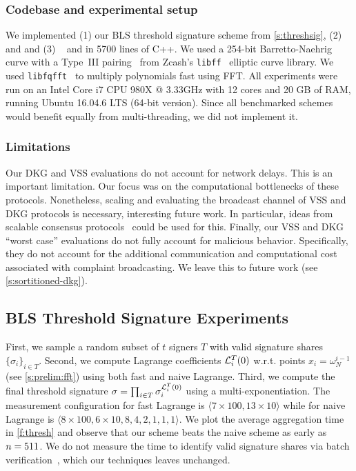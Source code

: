 \subsubsection{Codebase and experimental setup}
We implemented (1) our BLS threshold signature scheme from \cref{s:threshsig}, (2) \ejfdkg~\cite{Kate2010Distributed} and \ourdkg and (3) \evss~\cite{polycommit} and \ourvss in 5700 lines of C++.
We used a 254-bit Barretto-Naehrig curve with a Type~III pairing~\cite{bn-curve} from Zcash's \texttt{libff}~\cite{libff} elliptic curve library.
We used \texttt{libfqfft}~\cite{libfqfft} to multiply polynomials fast using FFT.
All experiments were run on an Intel Core i7 CPU 980X @ 3.33GHz with 12 cores and 20 GB of RAM, running Ubuntu 16.04.6 LTS (64-bit version).
Since all benchmarked schemes would benefit equally from multi-threading, we did not implement it.

\subsubsection{Limitations}
\label{s:eval:limitations}
Our DKG and VSS evaluations do not account for network delays.
This is an important limitation.
Our focus was on the computational bottlenecks of these protocols.
Nonetheless, scaling and evaluating the broadcast channel of VSS and DKG protocols is necessary, interesting future work.
In particular, ideas from scalable consensus protocols~\cite{algorand} could be used for this.
Finally, our VSS and DKG ``worst case'' evaluations do not fully account for malicious behavior.
Specifically, they do not account for the additional communication and computational cost associated with complaint broadcasting.
We leave this to future work (see \cref{s:sortitioned-dkg}).

\subsection{BLS Threshold Signature Experiments}
\label{s:eval:threshsig}
First, we sample a random subset of $t$ signers $T$ with valid signature shares $\{\sigma_i\}_{i\in T}$.
Second, we compute Lagrange coefficients $\mathcal{L}_i^T(0)$ w.r.t. points $x_i = \omega_N^{i-1}$ (see \cref{s:prelim:fft}) using both fast and naive Lagrange.
Third, we compute the final threshold signature $\sigma = \prod_{i\in T} \sigma_i^{\mathcal{L}_i^T(0)}$ using a multi-exponentiation.
The measurement configuration for fast Lagrange is $\langle 7 \times 100, 13 \times 10 \rangle$ while for naive Lagrange is $\langle 8\times 100, 6 \times 10, 8, 4, 2, 1,1,1\rangle$.
We plot the average aggregation time in \cref{f:thresh} and observe that our scheme beats the naive scheme as early as $n = 511$.
We do not measure the time to identify valid signature shares via batch verification~\cite{Boldyreva2003Threshold}, which our techniques leaves unchanged.

